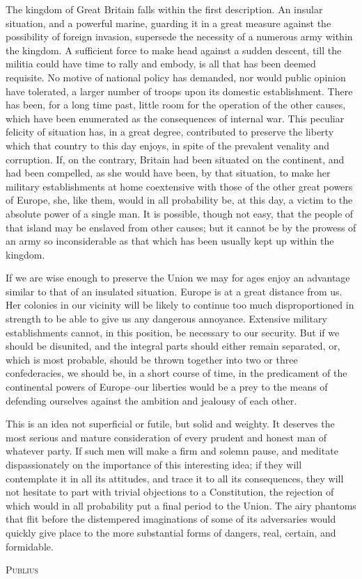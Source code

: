 The kingdom of Great Britain falls within the first description. An insular situation, and a powerful marine, guarding it in a great measure against the possibility of foreign invasion, supersede the necessity of a numerous army within the kingdom. A sufficient force to make head against a sudden descent, till the militia could have time to rally and embody, is all that has been deemed requisite. No motive of national policy has demanded, nor would public opinion have tolerated, a larger number of troops upon its domestic establishment. There has been, for a long time past, little room for the operation of the other causes, which have been enumerated as the consequences of internal war. This peculiar felicity of situation has, in a great degree, contributed to preserve the liberty which that country to this day enjoys, in spite of the prevalent venality and corruption. If, on the contrary, Britain had been situated on the continent, and had been compelled, as she would have been, by that situation, to make her military establishments at home coextensive with those of the other great powers of Europe, she, like them, would in all probability be, at this day, a victim to the absolute power of a single man. It is possible, though not easy, that the people of that island may be enslaved from other causes; but it cannot be by the prowess of an army so inconsiderable as that which has been usually kept up within the kingdom.

If we are wise enough to preserve the Union we may for ages enjoy an advantage similar to that of an insulated situation. Europe is at a great distance from us. Her colonies in our vicinity will be likely to continue too much disproportioned in strength to be able to give us any dangerous annoyance. Extensive military establishments cannot, in this position, be necessary to our security. But if we should be disunited, and the integral parts should either remain separated, or, which is most probable, should be thrown together into two or three confederacies, we should be, in a short course of time, in the predicament of the continental powers of Europe--our liberties would be a prey to the means of defending ourselves against the ambition and jealousy of each other.

This is an idea not superficial or futile, but solid and weighty. It deserves the most serious and mature consideration of every prudent and honest man of whatever party. If such men will make a firm and solemn pause, and meditate dispassionately on the importance of this interesting idea; if they will contemplate it in all its attitudes, and trace it to all its consequences, they will not hesitate to part with trivial objections to a Constitution, the rejection of which would in all probability put a final period to the Union. The airy phantoms that flit before the distempered imaginations of some of its adversaries would quickly give place to the more substantial forms of dangers, real, certain, and formidable.

\vspace{.5cm}
\textsc{Publius}
